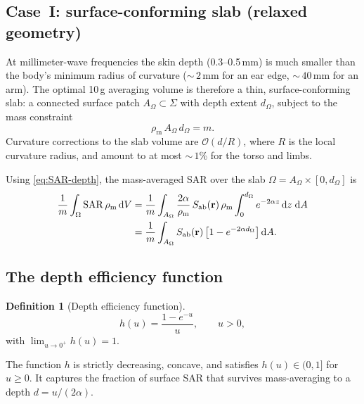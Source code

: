 \documentclass[11pt,a4paper]{article}
\theoremstyle{definition}
\newtheorem{definition}[theorem]{Definition}
\theoremstyle{remark}
\newcommand{\Sab}{S_{\mathrm{ab}}}
\newcommand{\SAR}{\ensuremath{\mathrm{SAR}}}
\newcommand{\rhom}{\rho_{\mathrm{m}}}
\begin{document}
\subsection{Case~I: surface-conforming slab (relaxed geometry)}
\label{sec:slab}

At millimeter-wave frequencies the skin depth (0.3--0.5\,mm) is much smaller
than the body's minimum radius of curvature (${\sim}\,2$\,mm for an ear edge,
${\sim}\,40$\,mm for an arm). The optimal 10\,g averaging volume is therefore a
thin, surface-conforming slab: a connected surface patch $A_\Omega \subset \Sigma$
with depth extent $d_\Omega$, subject to the mass constraint
\begin{equation}\label{eq:mass-constraint}
  \rhom\,A_\Omega\,d_\Omega = m.
\end{equation}
Curvature corrections to the slab volume are $\mathcal{O}(d/R)$, where $R$ is
the local curvature radius, and amount to at most ${\sim}\,1$\% for the torso
and limbs.

Using \cref{eq:SAR-depth}, the mass-averaged SAR over the slab
$\Omega = A_\Omega \times [0, d_\Omega]$ is
\begin{align}
  \frac{1}{m}\int_\Omega \SAR\,\rhom\,\mathrm{d}V
  &= \frac{1}{m}\int_{A_\Omega}
     \frac{2\alpha}{\rhom}\,\Sab(\vb{r})\,\rhom
     \int_0^{d_\Omega} e^{-2\alpha z}\,\mathrm{d}z\;\mathrm{d}A \notag\\
  &= \frac{1}{m}\int_{A_\Omega}\Sab(\vb{r})\,
     \bigl[1 - e^{-2\alpha d_\Omega}\bigr]\,\mathrm{d}A.
     \label{eq:slab-SAR}
\end{align}

\subsection{The depth efficiency function}

\begin{definition}[Depth efficiency function]\label{def:h}
\begin{equation}\label{eq:h-def}
  h(u) = \frac{1 - e^{-u}}{u}, \qquad u > 0,
\end{equation}
with $\lim_{u \to 0^+} h(u) = 1$.
\end{definition}

The function $h$ is strictly decreasing, concave, and satisfies $h(u) \in (0, 1]$
for $u \geq 0$. It captures the fraction of surface SAR that survives
mass-averaging to a depth $d = u/(2\alpha)$.
\end{document}
